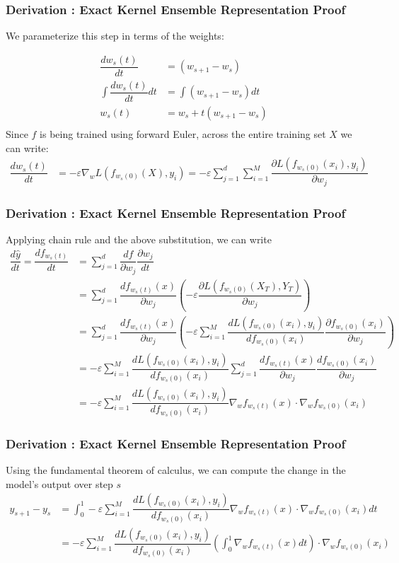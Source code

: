 \begin{frame}
  \frametitle{Derivation : Exact Kernel Ensemble Representation Proof}

We parameterize this step in terms of the weights:

\begin{align}
    \dfrac{d w_s(t)}{dt} &= (w_{s+1} - w_s)\\   
    \int \dfrac{d w_s(t)}{dt} dt &= \int (w_{s+1} - w_s)dt\\
    w_s(t) &= w_s + t(w_{s+1} - w_s)\\
\end{align}
Since $f$ is being trained using forward Euler, across the entire training set $X$ we can write:
\begin{align}
    \dfrac{d w_s(t)}{dt} &= -\varepsilon \nabla_w L(f_{w_s(0)}(X), y_i) = -\varepsilon \sum_{j = 1}^{d} \sum_{i=1}^M  \dfrac{\partial L(f_{w_s(0)}(x_i),  y_i)}{\partial w_j} \label{eq10}
\end{align}
\end{frame}
\begin{frame}
  \frametitle{Derivation : Exact Kernel Ensemble Representation Proof}

Applying chain rule and the above substitution, we can write
\begin{align}
    \dfrac{d \hat y}{dt} = \dfrac{d f_{w_s(t)}}{dt} &= \sum_{j = 1}^{d} \dfrac{d f}{\partial w_j} \dfrac{\partial w_j}{dt}\\
&= \sum_{j = 1}^{d} \dfrac{d f_{w_s(t)}(x)}{\partial w_j} \left(-\varepsilon \dfrac{\partial L(f_{w_s(0)}(X_T),  Y_T)}{\partial w_j}\right)\\
&= \sum_{j = 1}^{d} \dfrac{d f_{w_s(t)}(x)}{\partial w_j} \left(-\varepsilon \sum_{i = 1}^{M}\dfrac{d L(f_{w_s(0)}(x_i),  y_i)}{d f_{w_s(0)}(x_i)}\dfrac{\partial  f_{w_s(0)}(x_i)}{\partial w_j}\right)\\
&= -\varepsilon \sum_{i = 1}^{M} \dfrac{d L(f_{w_s(0)}(x_i),  y_i)}{d f_{w_s(0)}(x_i)} \sum_{j = 1}^{d} \dfrac{d f_{w_s(t)}(x)}{\partial w_j}  \dfrac{d f_{w_s(0)}(x_i)}{\partial w_j}\\
&= -\varepsilon \sum_{i = 1}^{M} \dfrac{d L(f_{w_s(0)}(x_i),  y_i)}{d f_{w_s(0)}(x_i)} \nabla_w f_{w_s(t)}(x) \cdot \nabla_w f_{w_s(0)}(x_i)\label{eq11}
\end{align}
\end{frame}
\begin{frame}
  \frametitle{Derivation : Exact Kernel Ensemble Representation Proof}

Using the fundamental theorem of calculus, we can compute the change in the model's output over step $s$
\begin{align}
    y_{s+1} - y_s &= \int_0^1 -\varepsilon \sum_{i = 1}^{M} \dfrac{d L(f_{w_s(0)}(x_i),  y_i)}{d f_{w_s(0)}(x_i)}  \nabla_w f_{w_s(t)}(x) \cdot \nabla_w f_{w_s(0)}(x_i)dt\\
 &=  -\varepsilon \sum_{i = 1}^{M} \dfrac{d L(f_{w_s(0)}(x_i),  y_i)}{d f_{w_s(0)}(x_i)}  \left(\int_0^1\nabla_w f_{w_s(t)}(x)dt\right) \cdot \nabla_w f_{w_s(0)}(x_i)
\end{align}
\end{frame}
